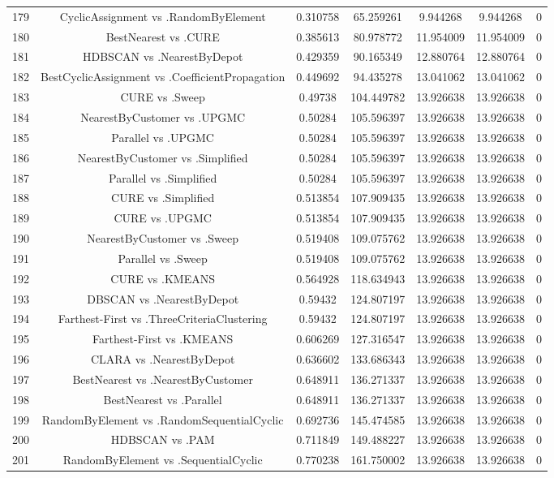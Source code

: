 \documentclass[a4paper,10pt]{article}
\begin{document}
\begin{landscape}
\begin{table}[!htp]
\begin{tabular}{ccccccc}
179&CyclicAssignment vs .RandomByElement&0.310758&65.259261&9.944268&9.944268&0\\
180&BestNearest vs .CURE&0.385613&80.978772&11.954009&11.954009&0\\
181&HDBSCAN vs .NearestByDepot&0.429359&90.165349&12.880764&12.880764&0\\
182&BestCyclicAssignment vs .CoefficientPropagation&0.449692&94.435278&13.041062&13.041062&0\\
183&CURE vs .Sweep&0.49738&104.449782&13.926638&13.926638&0\\
184&NearestByCustomer vs .UPGMC&0.50284&105.596397&13.926638&13.926638&0\\
185&Parallel vs .UPGMC&0.50284&105.596397&13.926638&13.926638&0\\
186&NearestByCustomer vs .Simplified&0.50284&105.596397&13.926638&13.926638&0\\
187&Parallel vs .Simplified&0.50284&105.596397&13.926638&13.926638&0\\
188&CURE vs .Simplified&0.513854&107.909435&13.926638&13.926638&0\\
189&CURE vs .UPGMC&0.513854&107.909435&13.926638&13.926638&0\\
190&NearestByCustomer vs .Sweep&0.519408&109.075762&13.926638&13.926638&0\\
191&Parallel vs .Sweep&0.519408&109.075762&13.926638&13.926638&0\\
192&CURE vs .KMEANS&0.564928&118.634943&13.926638&13.926638&0\\
193&DBSCAN vs .NearestByDepot&0.59432&124.807197&13.926638&13.926638&0\\
194&Farthest-First vs .ThreeCriteriaClustering&0.59432&124.807197&13.926638&13.926638&0\\
195&Farthest-First vs .KMEANS&0.606269&127.316547&13.926638&13.926638&0\\
196&CLARA vs .NearestByDepot&0.636602&133.686343&13.926638&13.926638&0\\
197&BestNearest vs .NearestByCustomer&0.648911&136.271337&13.926638&13.926638&0\\
198&BestNearest vs .Parallel&0.648911&136.271337&13.926638&13.926638&0\\
199&RandomByElement vs .RandomSequentialCyclic&0.692736&145.474585&13.926638&13.926638&0\\
200&HDBSCAN vs .PAM&0.711849&149.488227&13.926638&13.926638&0\\
201&RandomByElement vs .SequentialCyclic&0.770238&161.750002&13.926638&13.926638&0\\

\end{tabular}
\end{table}
\end{landscape}
\end{document}
